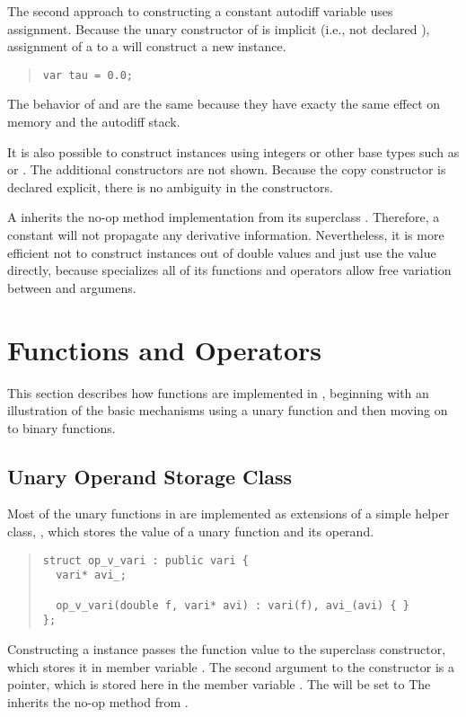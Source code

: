 \documentclass[10pt]{article}
\begin{document}
The second approach to constructing a constant autodiff variable uses
assignment.  Because the unary constructor of  is implicit
(i.e., not declared ), assignment of a  to
a  will construct a new  instance.  
%
\begin{quote}
\begin{Verbatim}
var tau = 0.0;
\end{Verbatim}
\end{quote}
%
The behavior of  and  are the same because they
have exacty the same effect on memory and the autodiff stack.

It is also possible to construct instances using integers or other
base types such as  or .  The
additional constructors are not shown.  Because the copy constructor
is declared explicit, there is no ambiguity in the constructors.

A  inherits the no-op  method implementation
from its superclass .  Therefore, a constant will not
propagate any derivative information.  Nevertheless, it is more
efficient not to construct  instances out of double values
and just use the  value directly, because
 specializes all of its functions and operators
allow free variation between  and  argumens.


\section{Functions and Operators}

This section describes how functions are implemented in
, beginning with an illustration of the basic
mechanisms using a unary function and then moving on to binary functions.

\subsection{Unary Operand Storage Class}

Most of the unary functions in  are implemented as
extensions of a simple helper class, , which stores
the value of a unary function and its operand.  
%
\begin{quote}
\begin{Verbatim}
struct op_v_vari : public vari {
  vari* avi_;

  op_v_vari(double f, vari* avi) : vari(f), avi_(avi) { }
};
\end{Verbatim}
\end{quote}
%
Constructing a  instance passes the function value
 to the superclass constructor, which stores it in member
variable .  The second argument to the constructor is a
 pointer, which is stored here in the member variable
.  The  will be set to The 
inherits the no-op  method from .
\end{document}
